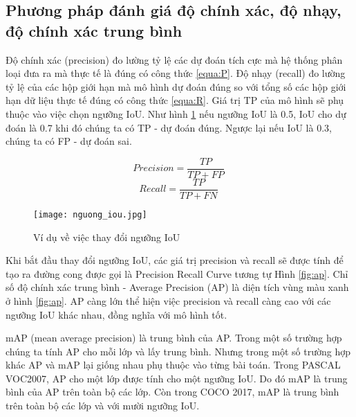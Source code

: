 \documentclass[../the.tex]{subfiles}
\begin{document}
\subsection{Phương pháp đánh giá độ chính xác, độ nhạy, độ chính xác trung bình}
{\fontsize{13}{12} \selectfont

	Độ chính xác (precision) đo lường tỷ lệ các dự đoán tích cực mà hệ thống phân loại đưa ra
	mà thực tế là đúng có công thức \ref{equa:P}.
	Độ nhạy (recall) đo lường tỷ lệ của các hộp giới hạn mà mô hình dự đoán đúng so với tổng số các hộp giới hạn dữ liệu thực tế đúng có công thức \ref{equa:R}.
	Giá trị TP của mô hình sẽ phụ thuộc vào việc chọn ngưỡng IoU.
	Như hình \ref{fig:nguong_iou} nếu ngưỡng IoU là 0.5, IoU cho dự đoán là 0.7 khi đó chúng ta có TP - dự đoán đúng. Ngược lại nếu IoU là 0.3, chúng ta có FP - dự đoán sai.

	\begin{equation}
		Precision = \frac{TP}{TP+FP}\
		\label{equa:P}
	\end{equation}
	\begin{equation}
		Recall = \frac{TP}{TP+FN}\
		\label{equa:R}
	\end{equation}

}
\begin{figure}[H]
	\centering
	\texttt{[image: nguong\_iou.jpg]}
	\caption{Ví dụ về việc thay đổi ngưỡng IoU}
	\label{fig:nguong_iou}
\end{figure}

{\fontsize{13}{12} \selectfont

Khi bắt đầu thay đổi ngưỡng IoU, các giá trị precision và recall sẽ được tính để tạo ra đường cong được gọi là Precision Recall Curve tương tự Hình \ref{fig:ap}.
Chỉ số độ chính xác trung bình - Average Precision (AP) là diện tích vùng màu xanh ở hình \ref{fig:ap}. AP càng lớn thể hiện việc precision và recall càng cao với các ngưỡng IoU khác nhau, đồng nghĩa với mô hình tốt.

}

\bigskip

{\fontsize{13}{12} \selectfont

	mAP (mean average precision) là trung bình của AP. Trong một số trường hợp chúng ta tính AP cho mỗi lớp và lấy trung bình. Nhưng trong một số trường hợp khác AP và mAP lại giống nhau phụ thuộc vào từng bài toán.
	Trong PASCAL VOC2007, AP cho một lớp được tính cho một ngưỡng IoU. Do đó mAP là trung bình của AP trên toàn bộ các lớp.
	Còn trong COCO 2017, mAP là trung bình trên toàn bộ các lớp và với mười ngưỡng IoU.

}
\end{document}
